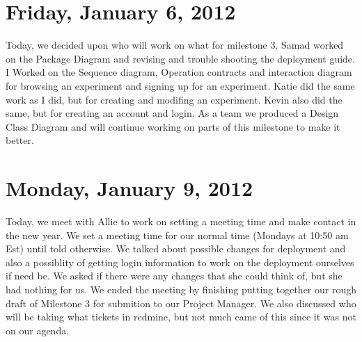 \documentclass{article}
\begin{document}
\section{Friday, January 6, 2012} %
Today, we decided upon who will work on what for milestone 3. Samad worked on the Package Diagram
and revising and trouble shooting the deployment guide.  I Worked on  the Sequence diagram, Operation
contracts and interaction diagram for browsing an experiment and signing up for an experiment.  Katie
did the same work as I did, but for creating and modifing an experiment.  Kevin also did the same, but for 
creating an account and login.  As a team we produced a Design Class Diagram and will continue working
on parts of this milestone to make it better.

\section{Monday, January 9, 2012} %
Today, we meet with Allie to work on setting a meeting time and make contact in the new year.  We set a
meeting time for our normal time (Mondays at 10:50 am Est) until told otherwise.  We talked about
possible changes for deployment and also a possiblity of getting login information to work on the deployment
ourselves if need be.  We asked if there were any changes that she could think of, but she had nothing for us.
We ended the meeting by finishing putting together our rough draft of Milestone 3 for submition to our Project
Manager.  We also discussed who will be taking what tickets in redmine, but not much came of this since it was 
not on our agenda.
\end{document}
